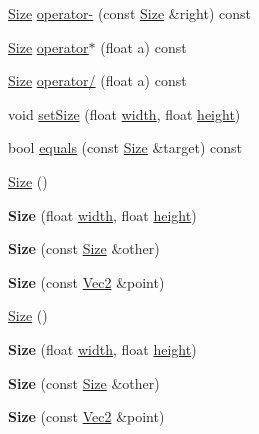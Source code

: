 \begin{DoxyCompactItemize}
\item 
\hyperlink{classSize}{Size} \hyperlink{classSize_a591e1fd7d3b14db4da48a836437becd9}{operator-\/} (const \hyperlink{classSize}{Size} \&right) const
\item 
\hyperlink{classSize}{Size} \hyperlink{classSize_aa927f929575591818d750e79453601c3}{operator$\ast$} (float a) const
\item 
\hyperlink{classSize}{Size} \hyperlink{classSize_a38a29b34d6e233b29743defc4a69319a}{operator/} (float a) const
\item 
void \hyperlink{classSize_a3aefde34596edaed033ec39a61891fca}{set\+Size} (float \hyperlink{classSize_af0be19024ddd79e7843492b3760c21f0}{width}, float \hyperlink{classSize_a880fa21eaad5a5a0fe439d440776fd05}{height})
\item 
bool \hyperlink{classSize_ad972167b9f67a3feac16fd7f0aeffbef}{equals} (const \hyperlink{classSize}{Size} \&target) const
\end{DoxyCompactItemize}
\textbf{ }\par
\begin{DoxyCompactItemize}
\item 
\hyperlink{classSize_afd63c52f6d531426d6c6044f02c4d4b5}{Size} ()
\item 
\mbox{\label{classSize_a920239af074c42b977048e33c16aea9c}} 
{\bfseries Size} (float \hyperlink{classSize_af0be19024ddd79e7843492b3760c21f0}{width}, float \hyperlink{classSize_a880fa21eaad5a5a0fe439d440776fd05}{height})
\item 
\mbox{\label{classSize_a123e6c6a024f575b3c53f895c82fc5ad}} 
{\bfseries Size} (const \hyperlink{classSize}{Size} \&other)
\item 
\mbox{\label{classSize_a15f958fd98b3d6248ccfe174286888b2}} 
{\bfseries Size} (const \hyperlink{classVec2}{Vec2} \&point)
\end{DoxyCompactItemize}

\textbf{ }\par
\begin{DoxyCompactItemize}
\item 
\hyperlink{classSize_a05347a96b95d4b93dbe51d159c40c8db}{Size} ()
\item 
\mbox{\label{classSize_a920239af074c42b977048e33c16aea9c}} 
{\bfseries Size} (float \hyperlink{classSize_af0be19024ddd79e7843492b3760c21f0}{width}, float \hyperlink{classSize_a880fa21eaad5a5a0fe439d440776fd05}{height})
\item 
\mbox{\label{classSize_a123e6c6a024f575b3c53f895c82fc5ad}} 
{\bfseries Size} (const \hyperlink{classSize}{Size} \&other)
\item 
\mbox{\label{classSize_a15f958fd98b3d6248ccfe174286888b2}} 
{\bfseries Size} (const \hyperlink{classVec2}{Vec2} \&point)
\end{DoxyCompactItemize}

